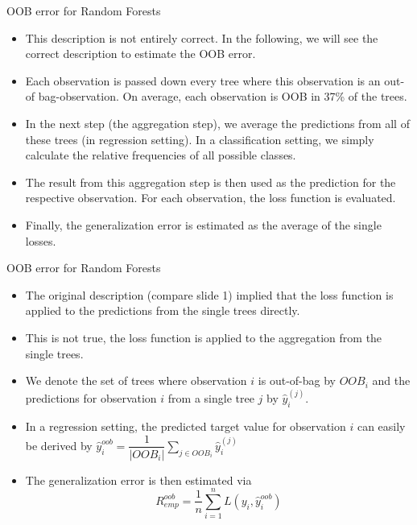 \begin{vbframe}{OOB error for Random Forests}
\begin{itemize}
\item This description is not entirely correct. In the following, we will see the correct description to estimate the OOB error. 
\item Each observation is passed down every  tree where this observation is an out-of bag-observation. On average, each observation is OOB in 37\% of the trees. 
\item In the next step (the aggregation step), we average the predictions from all of these trees (in regression setting). In a classification setting, we simply calculate the relative frequencies of all possible classes. 
\item The result from this aggregation step is then used as the prediction for the respective observation. For each observation, the loss function is evaluated. 
\item Finally, the generalization error is estimated as the average of the single losses.  
\end{itemize}
\end{vbframe}


\begin{vbframe}{OOB error for Random Forests}
\begin{itemize}
\item The original description (compare slide 1) implied that the loss function is applied to the predictions from the single trees directly. 
\item This is not true, the loss function is applied to the aggregation from the single trees. 
\item We denote the set of trees where observation $i$ is out-of-bag by $OOB_i$ and the predictions for observation $i$ from a single tree $j$ by $\hat y_i^{(j)}$.
\item In a regression setting, the predicted target value for observation $i$ can easily be derived by $\hat y^{oob}_{i} = \dfrac{1}{|OOB_i|}\sum\limits_{j\in OOB_i} \hat y_i^{(j)}$
\item The generalization error is then estimated via $$R_{emp}^{oob} = \dfrac 1n \sum_{i=1}^n L(y_i, \hat  y^{oob}_{i})$$
\end{itemize}
\end{vbframe}


